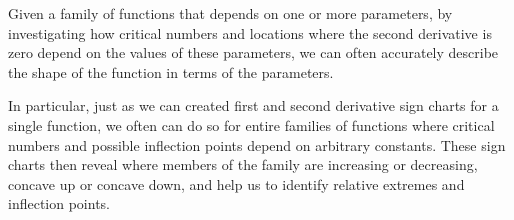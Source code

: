 \begin{summary}
\item Given a family of functions that depends on one or more parameters, by investigating how critical numbers and locations where the second derivative is zero depend on the values of these parameters, we can often accurately describe the shape of the function in terms of the parameters. 
\item In particular, just as we can created first and second derivative sign charts for a single function, we often can do so for entire families of functions where critical numbers and possible inflection points depend on arbitrary constants.  These sign charts then reveal where members of the family are increasing or decreasing, concave up or concave down, and help us to identify relative extremes and inflection points.
\end{summary}

\nin \hrulefill

 

\clearpage
